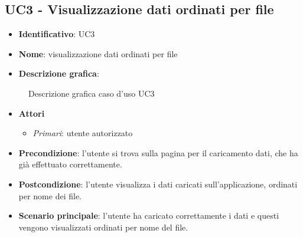 
\subsection{UC3 - Visualizzazione dati ordinati per file}
\begin{itemize}
  \item \textbf{Identificativo}: UC3
  \item \textbf{Nome}: visualizzazione dati ordinati per file
  \item \textbf{Descrizione grafica}:
\end{itemize}

\begin{figure}[h]
  \centering
  \caption{Descrizione grafica caso d'uso UC3}
\end{figure}

\begin{itemize}
  \item \textbf{Attori}
        \begin{itemize}
          \item \textit{Primari}: utente autorizzato
        \end{itemize}
  \item \textbf{Precondizione}: l'utente si trova sulla pagina per il caricamento dati, che ha già effettuato correttamente.
  \item \textbf{Postcondizione}: l'utente visualizza i dati caricati sull'applicazione, ordinati per nome dei file.
  \item \textbf{Scenario principale}: l'utente ha caricato correttamente i dati e questi vengono visualizzati ordinati per nome del file.
\end{itemize}
\newpage